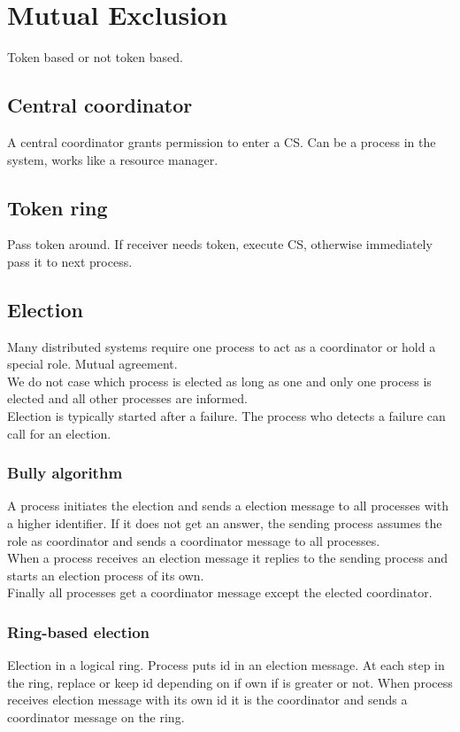 \documentclass[a4paper]{article}
\begin{document}
\section{Mutual Exclusion}
Token based or not token based.
\subsection{Central coordinator}
A central coordinator grants permission to enter a CS. Can be a process in the
system, works like a resource manager. 

\subsection{Token ring}
Pass token around. If receiver needs token, execute CS, otherwise immediately
pass it to next process.

\subsection{Election}
Many distributed systems require one process to act as a coordinator or hold a
special role. Mutual agreement. 
\\
We do not case which process is elected as long as one and only one process is
elected and all other processes are informed.\\
Election is typically started after a failure. The process who detects a failure
can call for an election. 
\subsubsection{Bully algorithm}
A process initiates the election and sends a election message to all processes
with a higher identifier. If it does not get an answer, the sending process
assumes the role as coordinator and sends a coordinator message to all
processes.\\
When a process receives an election message it replies to the sending process
and starts an election process of its own.\\
Finally all processes get a coordinator message except the elected coordinator.

\subsubsection{Ring-based election}
Election in a logical ring. Process puts id in an election message. At each step
in the ring, replace or keep id depending on if own if is greater or not. When
process receives election message with its own id it is the coordinator and
sends a coordinator message on the ring.
\end{document}
